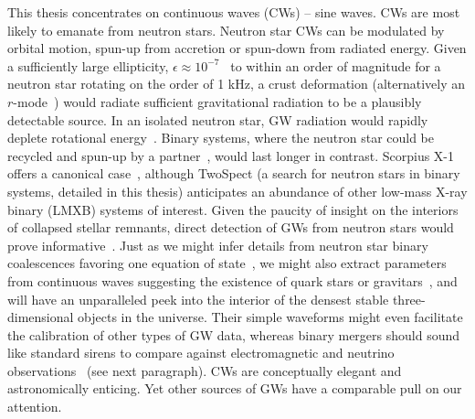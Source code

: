 This thesis concentrates on continuous waves (CWs) -- sine waves. 
CWs are most likely to emanate from neutron stars. 
Neutron star CWs can be modulated by orbital motion, spun-up from accretion or spun-down from radiated energy. 
Given a sufficiently large ellipticity, $\epsilon \approx 10^{-7}$~\cite{Owen2005} to within an order of magnitude for a neutron star rotating on the order of 1 kHz, a crust deformation (alternatively an $r$-mode~\cite{Owen1998,Owen2010}) would radiate sufficient gravitational radiation to be a plausibly detectable source. 
In an isolated neutron star, GW radiation would rapidly deplete rotational energy~\cite{Owen1998}.
Binary systems, where the neutron star could be recycled and spun-up by a partner~\cite{PapaloizouPringle1978,Wagoner1984}, would last longer in contrast.
Scorpius X-1 offers a canonical case~\cite{AbbottScoX12007}, although TwoSpect (a search for neutron stars in binary systems, detailed in this thesis) anticipates an abundance of other low-mass X-ray binary (LMXB) systems of interest. 
Given the paucity of insight on the interiors of collapsed stellar remnants, direct detection of GWs from neutron stars would prove informative~\cite{Lindblom1995}. 
Just as we might infer details from neutron star binary coalescences favoring one equation of state~\cite{Lattimer2007,Read2009}, we might also extract parameters from continuous waves suggesting the existence of quark stars or gravitars~\cite{Owen2005}, and will have an unparalleled peek into the interior of the densest stable three-dimensional objects in the universe. 
Their simple waveforms might even facilitate the calibration of other types of GW data, whereas binary mergers should sound like standard sirens to compare against electromagnetic and neutrino observations~\cite{Punturo2010}
(see next paragraph).
CWs are conceptually elegant and astronomically enticing.
Yet other sources of GWs have a comparable pull on our attention. 

